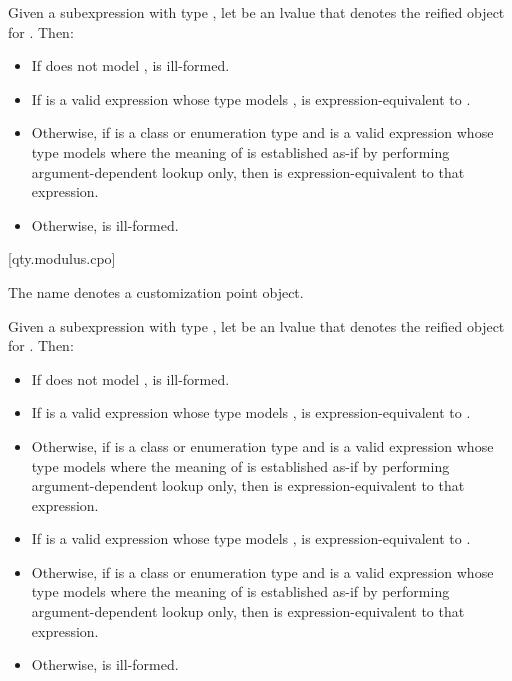 \pnum
Given a subexpression  with type ,
let  be an lvalue that denotes the reified object for .
Then:
\begin{itemize}
\item
If  does not model ,
 is ill-formed.
\item
If  is a valid expression whose type models ,
 is expression-equivalent to .
\item
Otherwise, if  is a class or enumeration type and
 is a valid expression whose type models 
where the meaning of  is established as-if by performing argument-dependent lookup only,
then  is expression-equivalent to that expression.
\item
Otherwise,  is ill-formed.
\end{itemize}

[qty.modulus.cpo]{}

\pnum
The name  denotes a customization point object.

\pnum
Given a subexpression  with type ,
let  be an lvalue that denotes the reified object for .
Then:
\begin{itemize}
\item
If  does not model ,
 is ill-formed.
\item
If  is a valid expression whose type models ,
 is expression-equivalent to .
\item
Otherwise, if  is a class or enumeration type and
 is a valid expression whose type models 
where the meaning of  is established as-if by performing argument-dependent lookup only,
then  is expression-equivalent to that expression.
\item
If  is a valid expression whose type models ,
 is expres\-sion-equivalent to .
\item
Otherwise, if  is a class or enumeration type and
 is a valid expression whose type models 
where the meaning of  is established as-if by performing argument-dependent lookup only,
then  is expression-equivalent to that expression.
\item
Otherwise,  is ill-formed.
\end{itemize}

